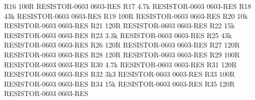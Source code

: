 \documentclass[11pt, a4paper]{article}[2009/11/13]
\begin{document}
R16     100R          RESISTOR-0603     0603-RES                                                                                        
R17     4.7k          RESISTOR-0603     0603-RES                                                                                        
R18     43k           RESISTOR-0603     0603-RES                                                                                        
R19     100R          RESISTOR-0603     0603-RES                                                                                        
R20     10k           RESISTOR-0603     0603-RES                                                                                        
R21     120R          RESISTOR-0603     0603-RES                                                                                        
R22     15k           RESISTOR-0603     0603-RES                                                                                        
R23     3.3k          RESISTOR-0603     0603-RES                                                                                        
R25     43k           RESISTOR-0603     0603-RES                                                                                        
R26     120R          RESISTOR-0603     0603-RES                                                                                        
R27     120R          RESISTOR-0603     0603-RES                                                                                        
R28     120R          RESISTOR-0603     0603-RES                                                                                        
R29     100R          RESISTOR-0603     0603-RES                                                                                        
R30     4.7k          RESISTOR-0603     0603-RES                                                                                        
R31     120R          RESISTOR-0603     0603-RES                                                                                        
R32     3k3           RESISTOR-0603     0603-RES                                                                                        
R33     100R          RESISTOR-0603     0603-RES                                                                                        
R34     15k           RESISTOR-0603     0603-RES                                                                                        
R35     120R          RESISTOR-0603     0603-RES                                                                                        
\end{document}
